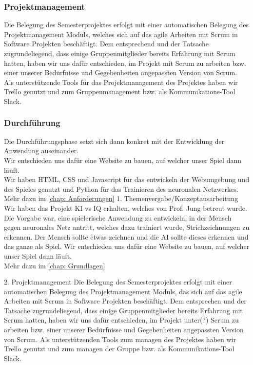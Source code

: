 \documentclass[11pt]{article}
\begin{document}
\subsubsection{  Projektmanagement }
\label{chap: Projektmanagement}
Die Belegung des Semesterprojektes erfolgt mit einer 						automatischen Belegung des Projektmanagement Moduls, 				welches sich auf das agile Arbeiten mit Scrum in Software 				Projekten beschäftigt. Dem entsprechend und der Tatsache 				zugrundeliegend, dass einige Gruppenmitglieder bereits 					Erfahrung mit Scrum hatten, haben wir uns dafür entschieden, im 	Projekt mit Scrum zu arbeiten bzw. einer unserer 						Bedürfnisse und Gegebenheiten angepassten Version von 				Scrum.\\
Als unterstützende Tools für das Projektmanagement des Projektes haben wir 	Trello genutzt und zum Gruppenmanagement bzw. als 		Kommunikations-Tool Slack.

\subsubsection{ Durchführung }
Die Durchführungsphase setzt sich dann konkret mit der 					Entwicklung der Anwendung auseinander.\\
Wir entschieden uns dafür eine Website zu bauen, auf welcher 			unser Spiel dann läuft.\\
Wir haben HTML, CSS und Javascript für das entwickeln der 			Webumgebung und des Spieles genutzt und Python für das 				Trainieren des neuronalen Netzwerkes.\\
Mehr dazu im \autoref{chap: Anforderungen}
1. Themenvergabe/Konzeptausarbeitung
	Wir haben das Projekt KI vs IQ erhalten, welches von Prof. Jung 		betreut wurde.
	Die Vorgabe war, eine spielerische Anwendung zu entwickeln, 			in der Mensch gegen neuronales Netz antritt, welches dazu 				trainiert wurde, Strichzeichnungen zu erkennen.
	Der Mensch sollte etwas zeichnen und die AI sollte dieses 				erkennen und das ganze als Spiel.
	Wir entschieden uns dafür eine Website zu bauen, auf welcher 			unser Spiel dann läuft. \\
	Mehr dazu im \autoref{chap: Grundlagen}

2. Projektmanagement
	Die Belegung des Semesterprojektes erfolgt mit einer 						automatischen Belegung des Projektmanagement Moduls, 				das sich auf das agile Arbeiten mit Scrum in Software 				Projekten beschäftigt. Dem entsprechen und der Tatsache 				zugrundeliegend, dass einige Gruppenmitglieder bereits 					Erfahrung mit Scrum hatten, haben wir uns dafür entschieden, im 	Projekt unter(?) Scrum zu arbeiten bzw. einer unserer 						Bedürfnisse und Gegebenheiten angepassten Version von 				Scrum.
	Als unterstützenden Tools zum managen des Projektes haben wir 	Trello genutzt und zum managen der Gruppe bzw. als 						Kommunikations-Tool Slack.
\end{document}
